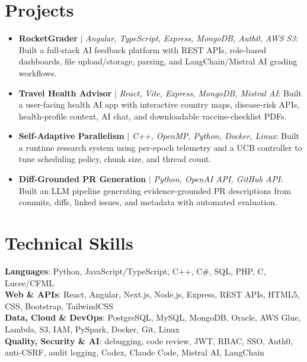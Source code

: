 \documentclass[letterpaper,11pt]{article}
\begin{document}
\section{Projects}
\begin{itemize}[leftmargin=0.15in, label={}, itemsep=1pt, topsep=1pt, parsep=0pt]
  \item\small{\textbf{RocketGrader} $|$ \emph{Angular, TypeScript, Express, MongoDB, Auth0, AWS S3}: Built a full-stack AI feedback platform with REST APIs, role-based dashboards, file upload/storage, parsing, and LangChain/Mistral AI grading workflows.}
  \item\small{\textbf{Travel Health Advisor} $|$ \emph{React, Vite, Express, MongoDB, Mistral AI}: Built a user-facing health AI app with interactive country maps, disease-risk APIs, health-profile context, AI chat, and downloadable vaccine-checklist PDFs.}
  \item\small{\textbf{Self-Adaptive Parallelism} $|$ \emph{C++, OpenMP, Python, Docker, Linux}: Built a runtime research system using per-epoch telemetry and a UCB controller to tune scheduling policy, chunk size, and thread count.}
  \item\small{\textbf{Diff-Grounded PR Generation} $|$ \emph{Python, OpenAI API, GitHub API}: Built an LLM pipeline generating evidence-grounded PR descriptions from commits, diffs, linked issues, and metadata with automated evaluation.}
\end{itemize}\vspace{-7pt}

\section{Technical Skills}
 \begin{itemize}[leftmargin=0.15in, label={}]
    \small{\item{
     \textbf{Languages}{: Python, JavaScript/TypeScript, C++, C\#, SQL, PHP, C, Lucee/CFML} \\
     \textbf{Web \& APIs}{: React, Angular, Next.js, Node.js, Express, REST APIs, HTML5, CSS, Bootstrap, TailwindCSS} \\
     \textbf{Data, Cloud \& DevOps}{: PostgreSQL, MySQL, MongoDB, Oracle, AWS Glue, Lambda, S3, IAM, PySpark, Docker, Git, Linux} \\
     \textbf{Quality, Security \& AI}{: debugging, code review, JWT, RBAC, SSO, Auth0, anti-CSRF, audit logging, Codex, Claude Code, Mistral AI, LangChain}
    }}
 \end{itemize}
\end{document}
